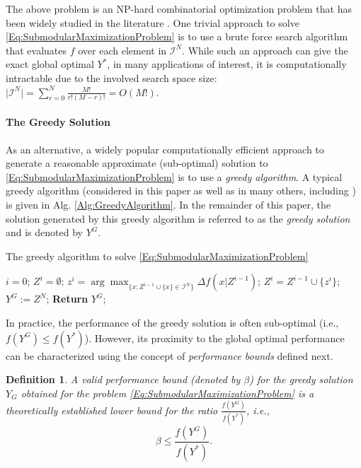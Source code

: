 \documentclass[conference]{IEEEtran}
\newtheorem{definition}{Definition}
\begin{document}
The above problem is an NP-hard combinatorial optimization problem that has been widely studied in the literature \cite{Liu2018}. One trivial approach to solve \eqref{Eq:SubmodularMaximizationProblem} is to use a brute force search algorithm that evaluates $f$ over each element in $\mathcal{I}^N$. While such an approach can give the exact global optimal $Y^*$, in many applications of interest, it is computationally intractable due to the involved search space size: $\vert \mathcal{I}^N \vert = \sum_{r=0}^N \frac{M!}{r!(M-r)!} = O(M!)$.   


\paragraph*{\textbf{The Greedy Solution}}

As an alternative, a widely popular computationally efficient approach to generate a reasonable approximate (sub-optimal) solution to \eqref{Eq:SubmodularMaximizationProblem} is to use a \emph{greedy algorithm}. A typical greedy algorithm (considered in this paper as well as in many others, including \cite{Nemhauser1978,Conforti1984,Wang2016,Liu2018}) is given in Alg. \ref{Alg:GreedyAlgorithm}. In the remainder of this paper, the solution generated by this greedy algorithm is referred to as the \emph{greedy solution} and is denoted by $Y^G$. 


\begin{algorithm}[!h]
\caption{The greedy algorithm to solve \eqref{Eq:SubmodularMaximizationProblem}}\label{Alg:GreedyAlgorithm}
\begin{algorithmic}[1]
\State $i=0$; $Z^i = \emptyset$;  
    \State $z^{i} = \arg \max_{\{x:Z^{i-1} \cup \{x\} \in \mathcal{I}^N\}} \Delta f(x \vert Z^{i-1})$;
    \State $Z^{i} = Z^{i-1} \cup \{z^{i}\}$; 
\EndFor
\State $Y^G := Z^N$;  \textbf{Return} $Y^G$;
\end{algorithmic}
\end{algorithm}


% 
In practice, the performance of the greedy solution is often sub-optimal (i.e., $f(Y^G) \leq f(Y^*)$). However, its proximity to the global optimal performance can be characterized using the concept of \emph{performance bounds} defined next. 

\begin{definition}\label{Def:PerformanceBound}
A valid \emph{performance bound} (denoted by $\beta$) for the greedy solution $Y_G$ obtained for the problem \eqref{Eq:SubmodularMaximizationProblem} is a theoretically established lower bound for the ratio $\frac{f(Y^G)}{f(Y^*)}$, i.e., 
\begin{equation}\label{Eq:Def:PerformanceBound}
    \beta \leq \frac{f(Y^G)}{f(Y^*)}.
\end{equation}
\end{definition}
\end{document}
